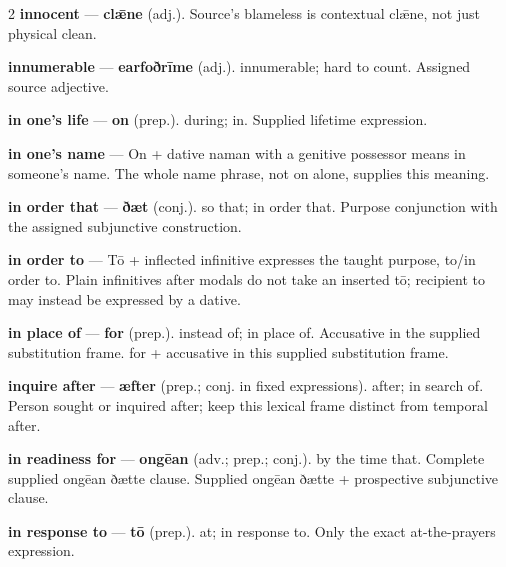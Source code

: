 \begin{multicols}{2}
\textbf{innocent} — \textbf{clǣne} (adj.). Source's blameless is contextual clǣne, not just physical clean.\par
\textbf{innumerable} — \textbf{earfoðrīme} (adj.). innumerable; hard to count. Assigned source adjective.\par
\textbf{in one's life} — \textbf{on} (prep.). during; in. Supplied lifetime expression.\par
\textbf{in one's name} — On + dative naman with a genitive possessor means in someone’s name. The whole name phrase, not on alone, supplies this meaning.\par
\textbf{in order that} — \textbf{ðæt} (conj.). so that; in order that. Purpose conjunction with the assigned subjunctive construction.\par
\textbf{in order to} — Tō + inflected infinitive expresses the taught purpose, to/in order to. Plain infinitives after modals do not take an inserted tō; recipient to may instead be expressed by a dative.\par
\textbf{in place of} — \textbf{for} (prep.). instead of; in place of. Accusative in the supplied substitution frame. for + accusative in this supplied substitution frame.\par
\textbf{inquire after} — \textbf{æfter} (prep.; conj. in fixed expressions). after; in search of. Person sought or inquired after; keep this lexical frame distinct from temporal after.\par
\textbf{in readiness for} — \textbf{ongēan} (adv.; prep.; conj.). by the time that. Complete supplied ongēan ðætte clause. Supplied ongēan ðætte + prospective subjunctive clause.\par
\textbf{in response to} — \textbf{tō} (prep.). at; in response to. Only the exact at-the-prayers expression.\par

\end{multicols}
